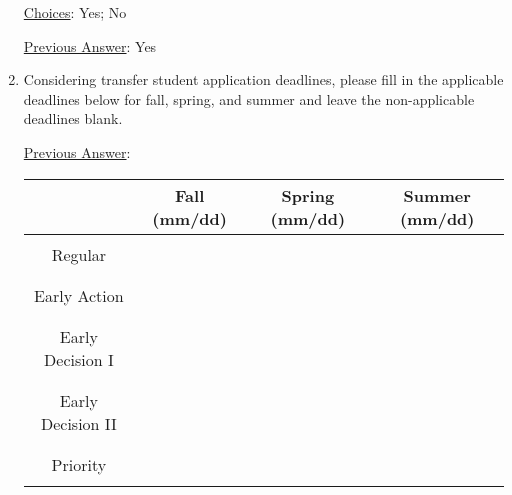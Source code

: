 \documentclass[12 pt, a4paper]{article}
\begin{document}
\begin{Form}
\begin{enumerate}
\underline{Choices}: Yes; No \medskip

\underline{Previous Answer}: Yes\medskip

\TextField[width = 6 in,multiline, name=90049]{} \medskip

\newpage

\item Considering transfer student application deadlines, please fill in the applicable deadlines below for fall, spring, and summer and leave the non-applicable deadlines blank.

\underline{Previous Answer}:

\begin{tabular}{|c|c|c|c|}
\hline
 & Fall (mm/dd) & Spring (mm/dd) & Summer (mm/dd)\\
 \hline
 &&&\\
Regular &  & &\\
&&&\\
\hline
&&&\\
Early Action &  & &\\
&&&\\
\hline
&&&\\
Early Decision I &  && \\
&&&\\
\hline
&&&\\
Early Decision II & &&\\
&&&\\
\hline
&&&\\
Priority & &&\\
&&&\\
\hline
\end{tabular}





\end{enumerate}
\end{Form}
\end{document}
